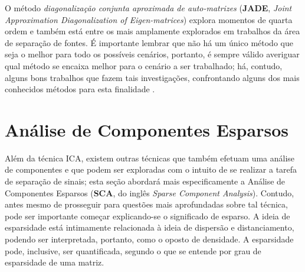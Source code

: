 O método \textit{diagonalização conjunta aproximada de auto-matrizes} (\textbf{JADE}, \textit{Joint Approximation Diagonalization of Eigen-matrices}) \citep{cardoso1999high} explora momentos de quarta ordem e também está entre os mais amplamente explorados em trabalhos da área de separação de fontes. É importante lembrar que não há um único método que seja o melhor para todo os possíveis cenários, portanto, é sempre válido averiguar qual método se encaixa melhor para o cenário a ser trabalhado; há, contudo, alguns bons trabalhos que fazem tais investigações, confrontando alguns dos mais conhecidos métodos para esta finalidade \citep{matic2009comparison, sahonerocomparison}.










\section{Análise de Componentes Esparsos}
\label{sec:bss_sca}

Além da técnica ICA, existem outras técnicas que também efetuam uma análise de componentes e que podem ser exploradas com o intuito de se realizar a tarefa de separação de sinais; esta seção abordará mais especificamente a Análise de Componentes Esparsos (\textbf{SCA}, do inglês \textit{Sparse Component Analysis}). Contudo, antes mesmo de prosseguir para questões mais aprofundadas sobre tal técnica, pode ser importante começar explicando-se o significado de esparso. A ideia de esparsidade está intimamente relacionada à ideia de dispersão e distanciamento, podendo ser interpretada, portanto, como o oposto de densidade. A esparsidade pode, inclusive, ser quantificada, segundo o que se entende por grau de esparsidade de uma matriz.\\


